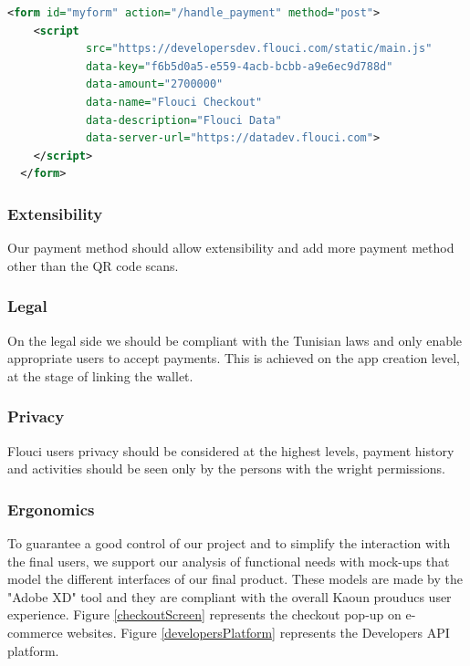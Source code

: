 \begin{spacing}{1.2}
\begin{lstlisting}[label=code:html,caption=Flouci Integration Java,language=xml]
 <form id="myform" action="/handle_payment" method="post">
    <script
            src="https://developersdev.flouci.com/static/main.js"
            data-key="f6b5d0a5-e559-4acb-bcbb-a9e6ec9d788d"
            data-amount="2700000"
            data-name="Flouci Checkout"
            data-description="Flouci Data"
            data-server-url="https://datadev.flouci.com">
    </script>
  </form>
\end{lstlisting}

\subsubsection{Extensibility}
Our payment method should allow extensibility and add more payment method other than the QR code scans. 
\subsubsection{Legal}
On the legal side we should be compliant with the Tunisian laws and only enable appropriate users to accept payments.
This is achieved on the app creation level, at the stage of linking the wallet.
\subsubsection{Privacy}
Flouci users privacy should be considered at the highest levels, payment history and activities should be seen only by the persons with the wright permissions.
\subsubsection{Ergonomics}
To guarantee a good control of our project and to simplify the interaction with the final users, we support our analysis of functional needs with mock-ups that model the different interfaces of our final product. These models are made by the "Adobe XD" tool and they are compliant with the overall Kaoun prouducs user experience. \newline Figure \ref{checkoutScreen} represents the checkout pop-up on e-commerce websites.
\newline Figure \ref{developersPlatform} represents the Developers API platform.


\end{spacing}
